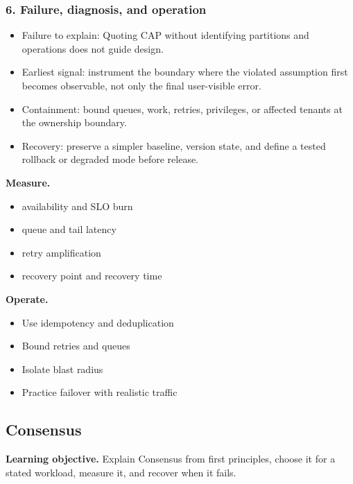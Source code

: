 \subsubsection*{6. Failure, diagnosis, and operation}
\begin{itemize}
\item Failure to explain: Quoting CAP without identifying partitions and operations does not guide design.
\item Earliest signal: instrument the boundary where the violated assumption first becomes observable, not only the final user-visible error.
\item Containment: bound queues, work, retries, privileges, or affected tenants at the ownership boundary.
\item Recovery: preserve a simpler baseline, version state, and define a tested rollback or degraded mode before release.
\end{itemize}
\textbf{Measure.}\begin{itemize}
\item availability and SLO burn
\item queue and tail latency
\item retry amplification
\item recovery point and recovery time
\end{itemize}
\textbf{Operate.}\begin{itemize}
\item Use idempotency and deduplication
\item Bound retries and queues
\item Isolate blast radius
\item Practice failover with realistic traffic
\end{itemize}
\subsection{Consensus}
\textbf{Learning objective.} Explain Consensus from first principles, choose it for a stated workload, measure it, and recover when it fails.
